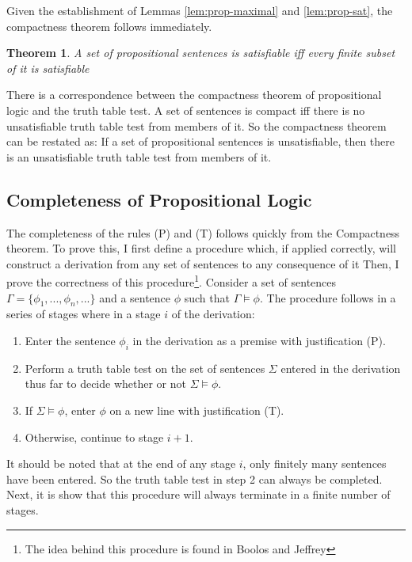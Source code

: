 \documentclass[12pt]{article}
\newtheorem{theorem}{Theorem}[section]
\theoremstyle{definition}
\theoremstyle{remark}
\begin{document}
Given the establishment of Lemmas \ref{lem:prop-maximal} and \ref{lem:prop-sat}, the compactness theorem follows immediately.

\begin{theorem}{}
	A set of propositional sentences is satisfiable iff every finite subset of it is satisfiable
\end{theorem}

There is a correspondence between the compactness theorem of propositional logic and the truth table test. A set of sentences is compact iff there is no unsatisfiable truth table test from members of it. So the compactness theorem can be restated as: If a set of propositional sentences is unsatisfiable, then there is an unsatisfiable truth table test from members of it.

\subsection{Completeness of Propositional Logic}

The completeness of the rules (P) and (T) follows quickly from the Compactness theorem. To prove this, I first define a procedure which, if applied correctly, will construct a derivation from any set of sentences to any consequence of it Then, I prove the correctness of this procedure\footnote{The idea behind this procedure is found in Boolos and Jeffrey\cite{boolosjeffrey}}. Consider a set of sentences $\Gamma = \{ \phi_1, ..., \phi_n, ... \}$ and a sentence $\phi$ such that $\Gamma \models \phi$. The procedure follows in a series of stages where in a stage $i$ of the derivation: 

\begin{enumerate}
	\item Enter the sentence $\phi_i$ in the derivation as a premise with justification (P).
	\item Perform a truth table test on the set of sentences $\Sigma$ entered in the derivation thus far to decide whether or not $\Sigma \models \phi$.
	\item If $\Sigma \models \phi$, enter $\phi$ on a new line with justification (T).
	\item Otherwise, continue to stage $i+1$.
\end{enumerate}

It should be noted that at the end of any stage $i$, only finitely many sentences have been entered. So the truth table test in step 2 can always be completed. Next, it is show that this procedure will always terminate in a finite number of stages.
\end{document}
